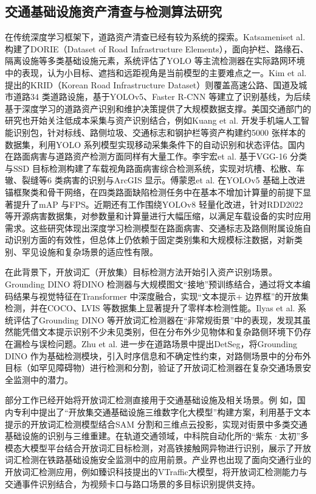 \subsection{交通基础设施资产清查与检测算法研究}
在传统深度学习框架下，道路资产清查已经有较为系统的探索。Katsameniset al. 构建了DORIE（Dataset of Road Infrastructure Elements），面向护栏、路缘石、隔离设施等多类基础设施元素，系统评估了YOLO 等主流检测器在实际路网环境中的表现，认为小目标、遮挡和远距视角是当前模型的主要难点之一\cite{katsamenis2025dorie}。Kim et al. 提出的KRID（Korean Road Infrastructure Dataset）则覆盖高速公路、国道及城市道路34 类道路设施，基于YOLOv5、Faster R-CNN 等建立了识别基线，为后续基于深度学习的道路资产识别和维护决策提供了大规模数据支撑\cite{kim2025krid}。美国交通部门的研究也开始关注低成本采集与资产识别结合，例如Kuang et al. 开发手机端人工智能识别包，针对标线、路侧垃圾、交通标志和钢护栏等资产构建约5000 张样本的数据集，利用YOLO 系列模型实现移动采集条件下的自动识别和状态评估\cite{kuang2024mobile}。国内在路面病害与道路资产检测方面同样有大量工作。李宇宏et al. 基于VGG-16 分类与SSD 目标检测构建了车载视角路面病害综合检测系统，实现对坑槽、松散、车辙、裂缝等6 类病害的识别与ArcGIS 显示\cite{韩豫2023基于深度学习和}。傅蒙恩et al. 在YOLOv5 基础上改进锚框聚类和骨干网络，在四类路面缺陷检测任务中在基本不增加计算量的前提下显著提升了mAP 与FPS\cite{傅蒙恩2025基于}。近期还有工作围绕YOLOv8 轻量化改进，针对RDD2022 等开源病害数据集，对参数量和计算量进行大幅压缩，以满足车载设备的实时应用需求\cite{胡凤阔2024一种基于改进}。这些研究体现出深度学习检测模型在路面病害、交通标志及路侧附属设施自动识别方面的有效性，但总体上仍依赖于固定类别集和大规模标注数据，对新类别、罕见设施和复杂场景的适应性有限。

在此背景下，开放词汇（开放集）目标检测方法开始引入资产识别场景。Grounding DINO 将DINO 检测器与大规模图文“接地”预训练结合，通过将文本编码结果与视觉特征在Transformer 中深度融合，实现“文本提示+ 边界框”的开放集检测，并在COCO、LVIS 等数据集上显著提升了零样本检测性能\cite{liu2024grounding}。Ilyas et al. 系统评估了Grounding DINO 等开放词汇检测器在“非常规街景”中的表现，发现其虽然能凭借文本提示识别不少未见类别，但在分布外少见物体和复杂路侧环境下仍存在漏检与误检问题\cite{ilyas2024potential}。Zhu et al. 进一步在道路场景中提出DetSeg，将Grounding DINO 作为基础检测模块，引入时序信息和不确定性约束，对路侧场景中的分布外目标（如罕见障碍物）进行检测和分割，验证了开放词汇检测器在复杂交通场景安全监测中的潜力\cite{zhu2025detseg}。

部分工作已经开始将开放词汇检测直接用于交通基础设施及相关场景。例
如，国内专利中提出了“开放集交通基础设施三维数字化大模型”构建方案，利用基于文本提示的开放词汇检测模型结合SAM 分割和三维点云投影，实现对街景中多类交通基础设施的识别与三维重建\cite{CN120125811A}。在轨道交通领域，中科院自动化所的“紫东·太初”多模态大模型平台结合开放词汇目标检测，对高铁接触网异物进行识别，展示了开放词汇检测在铁路基础设施安全监测中的应用前景\cite{NCSTI2023AIrail}。产业界也出现了面向交通行业的开放词汇检测应用，例如臻识科技提出的VTraffic大模型，将开放词汇检测能力与交通事件识别结合，为视频卡口与路口场景的多目标识别提供支持\cite{7its2024trafficAImodel}。

